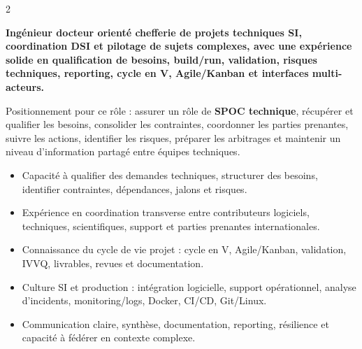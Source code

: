 \documentclass[8pt,a4paper,ragged2e,withhyper]{altacv}
\begin{document}
\begin{paracol}{2}
\switchcolumn


\textbf{Ingénieur docteur orienté chefferie de projets techniques SI, coordination DSI et pilotage de sujets complexes, avec une expérience solide en qualification de besoins, build/run, validation, risques techniques, reporting, cycle en V, Agile/Kanban et interfaces multi-acteurs.}

Positionnement pour ce rôle : assurer un rôle de \textbf{SPOC technique}, récupérer et qualifier les besoins, consolider les contraintes, coordonner les parties prenantes, suivre les actions, identifier les risques, préparer les arbitrages et maintenir un niveau d’information partagé entre équipes techniques.

\begin{itemize}
  \item Capacité à qualifier des demandes techniques, structurer des besoins, identifier contraintes, dépendances, jalons et risques.
  \item Expérience en coordination transverse entre contributeurs logiciels, techniques, scientifiques, support et parties prenantes internationales.
  \item Connaissance du cycle de vie projet : cycle en V, Agile/Kanban, validation, IVVQ, livrables, revues et documentation.
  \item Culture SI et production : intégration logicielle, support opérationnel, analyse d’incidents, monitoring/logs, Docker, CI/CD, Git/Linux.
  \item Communication claire, synthèse, documentation, reporting, résilience et capacité à fédérer en contexte complexe.
\end{itemize}


\divider
{}
\divider

\medskip


\divider
{}
\divider
{}
\divider
{}



\end{paracol}
\end{document}
